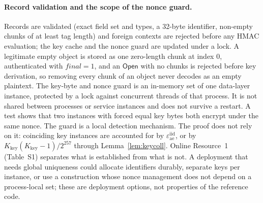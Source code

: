 \documentclass[pdflatex,sn-mathphys-num]{sn-jnl}%
\theoremstyle{plain}
\theoremstyle{definition}
\begin{document}
\paragraph{Record validation and the scope of the nonce guard.}
Records are validated (exact field set and types, a 32-byte identifier, non-empty chunks of at least tag length) and foreign contexts are rejected before any HMAC evaluation; the key cache and the nonce guard are updated under a lock. A legitimate empty object is stored as one zero-length chunk at index $0$, authenticated with $\mathit{final}=1$, and an $\mathsf{Open}$ with no chunks is rejected before key derivation, so removing every chunk of an object never decodes as an empty plaintext. The key-byte and nonce guard is an in-memory set of one data-layer instance, protected by a lock against concurrent threads of that process. It is not shared between processes or service instances and does not survive a restart. A test shows that two instances with forced equal key bytes both encrypt under the same nonce. The guard is a local detection mechanism. The proof does not rely on it: coinciding key instances are accounted for by $\varepsilon^{\mathrm{iid}}_{\mathrm{ae}}$, or by $K_{\mathrm{key}}(K_{\mathrm{key}}-1)/2^{257}$ through Lemma~\ref{lem:keycoll}. Online Resource~1 (Table~S1) separates what is established from what is not. A deployment that needs global uniqueness could allocate identifiers durably, separate keys per instance, or use a construction whose nonce management does not depend on a process-local set; these are deployment options, not properties of the reference code.
\end{document}
